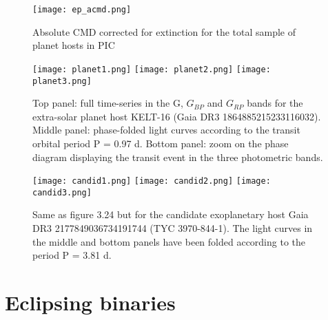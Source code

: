 \begin{comment}
\begin{figure}[H]
\centering
\texttt{[image: ep\_cmd.png]}
\caption{Absolute CMD corrected for extinction for the planet hosts in LOPN1}
\label{fig:Absolute CMD corrected for extinction for the planet hosts in LOPN1}
\end{figure}


\begin{figure}[H]
\centering
\texttt{[image: ep2\_cmd.png]}
\caption{Absolute CMD corrected for extinction for the planet hosts in LOPS2}
\label{fig:Absolute CMD corrected for extinction for the planet hosts in LOPS2}
\end{figure}
\end{comment}

\begin{figure}[H]
\centering
\texttt{[image: ep\_acmd.png]}
\caption{Absolute CMD corrected for extinction for the total sample of planet hosts in PIC}
\label{fig:Absolute CMD corrected for extinction for the total sample of planet hosts in PIC}
\end{figure}


\begin{figure}[H]
\centering
\texttt{[image: planet1.png]}
\texttt{[image: planet2.png]}
\texttt{[image: planet3.png]}
\caption{Top panel: full time-series in the G, $G_{BP}$ and $G_{RP}$ bands for the extra-solar planet host KELT-16 (Gaia DR3 1864885215233116032).
Middle panel: phase-folded light curves according to the transit orbital period P = 0.97 d.
Bottom panel: zoom on the phase diagram displaying the transit event in the three photometric bands. }
\label{fig:planetary}
\end{figure}


\begin{figure}[H]
\centering
\texttt{[image: candid1.png]}
\texttt{[image: candid2.png]}
\texttt{[image: candid3.png]}
\caption{Same as figure 3.24 but for the candidate exoplanetary host Gaia DR3 2177849036734191744 (TYC 3970-844-1).
The light curves in the middle and bottom panels have been folded according to the period P = 3.81 d. }
\label{fig:candidate}
\end{figure}








\newpage

\section{Eclipsing binaries}

